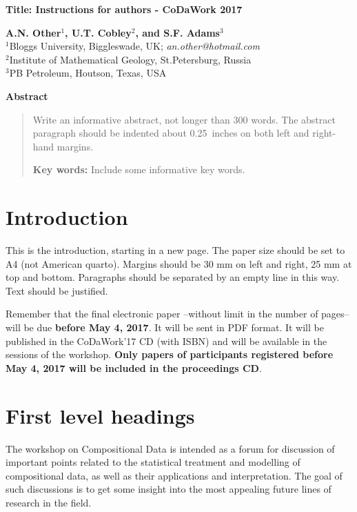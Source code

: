 \documentclass [10pt]{article}
\begin{document}
\begin{center}
\textbf{\large Title: Instructions for authors - CoDaWork 2017}

\bigskip
\textbf{A.N. Other}$^{1}$\textbf{, U.T. Cobley}$^{2}$\textbf{, and S.F. Adams}$^{3}$ \\
{\small
$^{1}$Bloggs University, Biggleswade, UK; \textit{an.other@hotmail.com} \\
$^{2}$Institute of Mathematical Geology, St.Petersburg, Russia \\
$^{3}$PB Petroleum, Houtson, Texas, USA}
\end{center}

\bigskip
{\centerline{\bf Abstract}}

\begin{quote}
Write an informative abstract, not longer than 300 words. The abstract paragraph should be indented about 0.25~inches on both left and right-hand margins.

\medskip

{\bf Key words: } Include some informative key words. \par
\end{quote}

\newpage

\section{Introduction}
This is the introduction, starting in a new page. The paper size should be set to A4 (not American quarto).
Margins should be 30 mm on left and right, 25 mm at top and bottom. Paragraphs should be separated by an empty line in
this way. Text should be justified.

Remember that the final electronic paper --without limit in the number of pages-- will be due {\bf before May 4,
2017}. It will be sent in PDF format. It will be published in the CoDaWork'17 CD (with ISBN) and will be available in
the sessions of the workshop. {\bf Only papers of participants registered before May 4, 2017 will be included in the
proceedings CD}.

\section{First level headings}
The workshop on Compositional Data is intended as a forum for discussion of important points related to the statistical treatment and modelling of compositional data, as well as their applications and interpretation. The goal of such
discussions is to get some insight into the most appealing future lines of research in the field.
\end{document}
